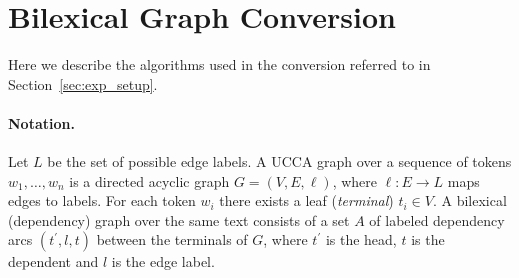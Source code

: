 \documentclass[11pt,a4paper]{article}
\newcommand{\secref}[1]{Section~\ref{#1}}
\begin{document}
\begin{table}
\caption{Hyperparameters used for the different classifiers.}
\label{table:hyperparameters}
\end{table}

\section{Bilexical Graph Conversion}
\label{appendix:conversion}

Here we describe the algorithms used in the conversion referred to in \secref{sec:exp_setup}.

\paragraph{Notation.}
Let $L$ be the set of possible edge labels.
A UCCA graph over a sequence of tokens $w_1, \ldots, w_n$ is a directed acyclic graph
$G=(V,E, \ell)$, where $\ell:E\to L$ maps edges to labels.
For each token $w_i$ there exists a leaf (\emph{terminal}) $t_i \in V$.
A bilexical (dependency) graph over the same text consists of a set $A$ of
labeled dependency arcs $(t^\prime,l,t)$
between the terminals of $G$, where $t^\prime$ is the head, $t$ is the dependent and $l$ is
the edge label.
\end{document}
